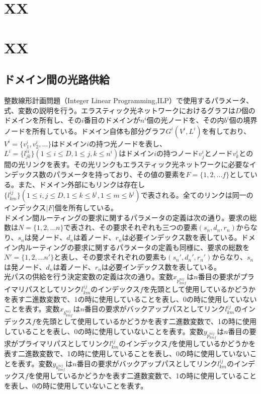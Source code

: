 \documentclass[a4j,twocolumn,fleqn]{jarticle}
\begin{document}
 
\Title
\section{XX}

\section{XX}
%
\subsection{ドメイン間の光路供給}
整数線形計画問題（Integer Linear Programming,ILP）で使用するパラメータ、式、変数の説明を行う。エラスティック光ネットワークにおけるグラフは$D$個のドメインを所有し、その$i$番目のドメインが$n^i$個の光ノードを、その内$b^i$個の境界ノードを所有している。ドメイン自体も部分グラフ$G^i (V^i ,L^i)$を有しており、 $V^i = \{v^i_1,v^i_2, \dots \} $はドメイン$i$の持つ光ノードを表し、$L^i = \{l^{ii}_{jk}\}(1\leq i \leq D,1\leq j,k \leq n^i)$はドメイン$i$の持つノード$v^i_j$とノード$v^i_k$との間の光リンクを表す。その光リンクもエラスティック光ネットワークに必要なインデックス数のパラメータを持っており、その値の要素を$F=\{1,2,\dots f\}$としている。また、ドメイン外部にもリンクは存在し$\{l^{ij}_{km}\}(1\leq i,j\leq D,1\leq k\leq b^i,1\leq m \leq b^j)$で表される。全てのリンクは同一のインデックス$|F|$個を所有している。\\
ドメイン間ルーティングの要求に関するパラメータの定義は次の通り。要求の総数は$N=\{1,2,\dots n\}$で表され、その要求それぞれも三つの要素$(s_n,d_n,r_n)$からなり、$s_n$は発ノード、$d_n$は着ノード、$r_n$は必要インデックス数を表している。ドメイン内ルーティングの要求に関するパラメータの定義も同様に、要求の総数を$N'=\{1,2,\dots n'\}$と表し、その要求それぞれの要素も$(s_n',d_n',r_n')$からなり、$s_n$は発ノード、$d_n$は着ノード、$r_n$は必要インデックス数を表している。\\
光パスの供給を行う決定変数の定義は次の通り。変数$x_{p^{nij}_{kmf}}$は$n$番目の要求がプライマリパスとしてリンク$l^{ij}_{km}$のインデックス$f$を先頭として使用しているかどうかを表す二進数変数で、1の時に使用していることを表し、0の時に使用していないことを表す。変数$x_{b^{nij}_{kmf}}$は$n$番目の要求がバックアップパスとしてリンク$l^{ij}_{km}$のインデックス$f$を先頭として使用しているかどうかを表す二進数変数で、1の時に使用していることを表し、0の時に使用していないことを表す。変数$y_{p^{nij}_{kmf}}$は$n$番目の要求がプライマリパスとしてリンク$l^{ij}_{km}$のインデックス$f$を使用しているかどうかを表す二進数変数で、1の時に使用していることを表し、0の時に使用していないことを表す。変数$y_{b^{nij}_{kmf}}$は$n$番目の要求がバックアップパスとしてリンク$l^{ij}_{km}$のインデックス$f$を使用しているかどうかを表す二進数変数で、1の時に使用していることを表し、0の時に使用していないことを表す。\\
\end{document}
